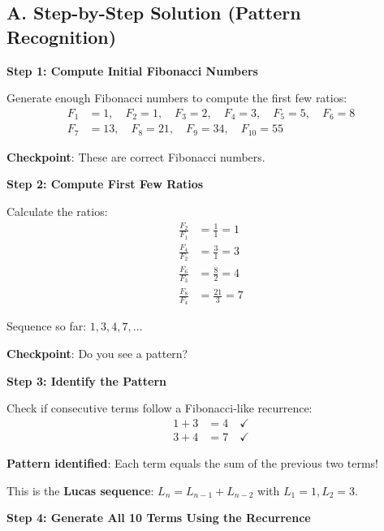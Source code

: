 \documentclass[12pt]{article}
\begin{document}
\begin{solutionbox}
\subsection*{A. Step-by-Step Solution (Pattern Recognition)}

\textbf{Step 1: Compute Initial Fibonacci Numbers}

Generate enough Fibonacci numbers to compute the first few ratios:
\begin{align*}
    F_1 &= 1, \quad F_2 = 1, \quad F_3 = 2, \quad F_4 = 3, \quad F_5 = 5, \quad F_6 = 8 \\
    F_7 &= 13, \quad F_8 = 21, \quad F_9 = 34, \quad F_{10} = 55
\end{align*}

\textbf{Checkpoint}: These are correct Fibonacci numbers.

\vspace{0.3cm}

\textbf{Step 2: Compute First Few Ratios}

Calculate the ratios:
\begin{align*}
    \frac{F_2}{F_1} &= \frac{1}{1} = 1 \\
    \frac{F_4}{F_2} &= \frac{3}{1} = 3 \\
    \frac{F_6}{F_3} &= \frac{8}{2} = 4 \\
    \frac{F_8}{F_4} &= \frac{21}{3} = 7
\end{align*}

Sequence so far: $1, 3, 4, 7, \ldots$

\textbf{Checkpoint}: Do you see a pattern?

\vspace{0.3cm}

\textbf{Step 3: Identify the Pattern}

Check if consecutive terms follow a Fibonacci-like recurrence:
\begin{align*}
    1 + 3 &= 4 \quad \checkmark \\
    3 + 4 &= 7 \quad \checkmark
\end{align*}

\textbf{Pattern identified}: Each term equals the sum of the previous two terms!

This is the \textbf{Lucas sequence}: $L_n = L_{n-1} + L_{n-2}$ with $L_1 = 1, L_2 = 3$.

\vspace{0.3cm}

\textbf{Step 4: Generate All 10 Terms Using the Recurrence}


\end{solutionbox}
\end{document}
